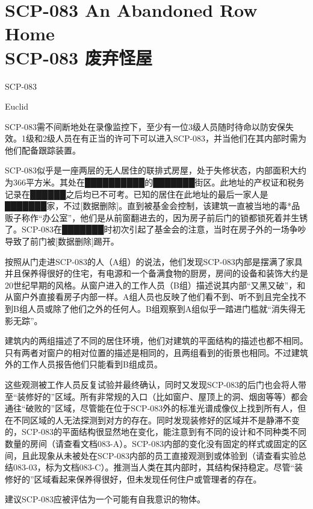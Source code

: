 \chapter[SCP-083 废弃怪屋]{
    SCP-083 An Abandoned Row Home\\
    SCP-083 废弃怪屋
}

\label{chap:SCP-083}

SCP-083

Euclid

SCP-083需不间断地处在录像监控下，至少有一位3级人员随时待命以防安保失效。1级和2级人员在有正当的许可下可以进入SCP-083，并当他们在其内部时需为他们配备跟踪装置。

SCP-083似乎是一座两层的无人居住的联排式房屋，处于失修状态，内部面积大约为366平方米。其处在██████████的███████街区。此地址的产权证和税务记录在██████之后均已不可考。已知的居住在此地址的最后一家人是███████家，不过{[}数据删除]。直到被基金会控制，该建筑一直被当地的毒*品贩子称作“办公室”，他们是从前窗翻进去的，因为房子前后门的锁都锁死着并生锈了。SCP-083在███████时初次引起了基金会的注意，当时在房子外的一场争吵导致了前门被{[}数据删除]踢开。

按照从门走进SCP-083的人（A组）的说法，他们发现SCP-083内部是摆满了家具并且保养得很好的住宅，有电源和一个备满食物的厨房，房间的设备和装饰大约是20世纪早期的风格。从窗户进入的工作人员（B组）描述说其内部“又黑又破”，和从窗户外直接看房子内部一样。A组人员也反映了他们看不到、听不到且完全找不到B组人员或除了他们之外的任何人。B组观察到A组似乎一踏进门槛就“消失得无影无踪”。

建筑内的两组描述了不同的居住环境，他们对建筑的平面结构的描述也都不相同。只有两者对窗户的相对位置的描述是相同的，且两组看到的街景也相同。不过建筑外的工作人员报告他们只能看到B组成员。

这些观测被工作人员反复试验并最终确认，同时又发现SCP-083的后门也会将人带至“装修好的”区域。所有非常规的入口（比如窗户、屋顶上的洞、烟囱等等）都会通往“破败的”区域，尽管能在位于SCP-083外的标准光谱成像仪上找到所有人，但在不同区域的人无法探测到对方的存在。同时发现装修好的区域并不是静滞不变的，SCP-083的平面结构很显然地在变化，能注意到有不同的设计和不同种类不同数量的房间（请查看文档083-A）。SCP-083内部的变化没有固定的样式或固定的区间，且此现象从未被处在SCP-083内部的员工直接观测到或体验到（请查看实验总结083-03，标为文档083-C）。推测当人类在其内部时，其结构保持稳定。尽管“装修好的”区域看起来保养得很好，但未发现任何住户或管理者的存在。

建议SCP-083应被评估为一个可能有自我意识的物体。

